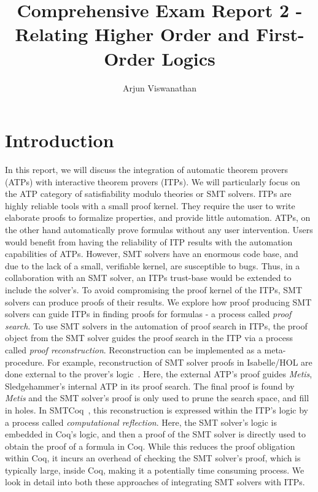 \documentclass{article}
\begin{document}
\title{Comprehensive Exam Report 2 - Relating Higher Order and First-Order Logics}
\author{Arjun Viswanathan}
\date{}
\maketitle

\section{Introduction}
\label{sec:intro}
	In this report, we will discuss the 
	integration of automatic theorem provers 
	(ATPs) with interactive theorem 
	provers (ITPs). We will particularly
	focus on the ATP category of 
	satisfiability modulo theories or 
	SMT solvers. ITPs are highly 
	reliable tools with a small proof kernel. 
	They require the user to write elaborate 
	proofs to formalize properties, and 
	provide little automation. ATPs, on the 
	other hand automatically prove formulas
	without any user intervention.  
	Users would benefit from having 
	the reliability of ITP results 
	with the automation capabilities
	of ATPs. However, SMT solvers have an 
	enormous code base, and due to the 
	lack of a small, verifiable kernel, 
	are susceptible to bugs. Thus, in a 
	collaboration with an SMT 
	solver, an ITPs trust-base would be 
	extended to include the solver's. To 
	avoid compromising the proof kernel of 
	the ITPs, SMT solvers can 
	produce proofs of their results. 
	We explore how proof producing 
	SMT solvers can guide ITPs in 
	finding proofs for formulas - 
	a process called \textit{proof 
	search}. To use SMT solvers in the
	automation of proof search in 
	ITPs, the proof object from the SMT 
	solver guides the proof search 
	in the ITP via a process called
	\textit{proof reconstruction}.
	Reconstruction can be implemented 
	as a meta-procedure. For example, 
	reconstruction of SMT solver proofs 
	in Isabelle/HOL are done external to 
	the prover's logic~\cite{bohme}.
	Here, the external ATP's proof guides 
	\textit{Metis}, Sledgehammer's
	internal ATP in its proof search.
	The final proof is found by 
	\textit{Metis} and the SMT solver's 
	proof is only used to prune the 
	search space, and fill in holes.
	In SMTCoq~\cite{DBLP:phd/hal/Keller13},
	this reconstruction is 
	expressed within the ITP's logic 
	by a process called 
	\textit{computational reflection}.
	Here, the SMT solver's logic is 
	embedded in Coq's logic, and then 
	a proof of the SMT solver is 
	directly used to obtain the 
	proof of a formula in Coq. 
	While this reduces the 
	proof obligation within Coq, it incurs
	an overhead of checking the SMT 
	solver's proof, which is typically 
	large, inside Coq, making it a
	potentially time consuming process. 
	We look in detail into both these 
	approaches of integrating SMT solvers 
	with ITPs.
	
\end{document}
